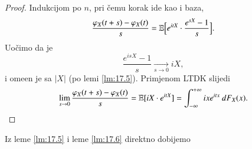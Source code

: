 \begin{proof}
    Indukcijom po $n$, pri \v cemu korak ide kao i baza,
    \begin{equation*}
        \frac{\varphi_X (t + s) - \varphi_X (t)}{s} = \mathbb{E} \Big[ e^{i t X} \cdot \frac{e^{s X} - 1}{s} \Big].
    \end{equation*}
    Uo\v cimo da je
    \begin{equation*}
        \frac{e^{i s X} - 1}{s} \xrightarrow[s \to 0]{} i X,
    \end{equation*}
    i ome\dj en je sa $|X|$ (po lemi \ref{lm:17.5}).
    Primjenom LTDK slijedi
    \begin{equation*}
        \lim\limits_{s \to 0} \frac{\varphi_X (t + s) - \varphi_X (t)}{s} = \mathbb{E} [i X \cdot e^{i t X}] = \int_{-\infty}^{+\infty} i x e^{i t x} \: d F_X (x).
    \end{equation*}
\end{proof}

Iz leme \ref{lm:17.5} i leme \ref{lm:17.6} direktno dobijemo

